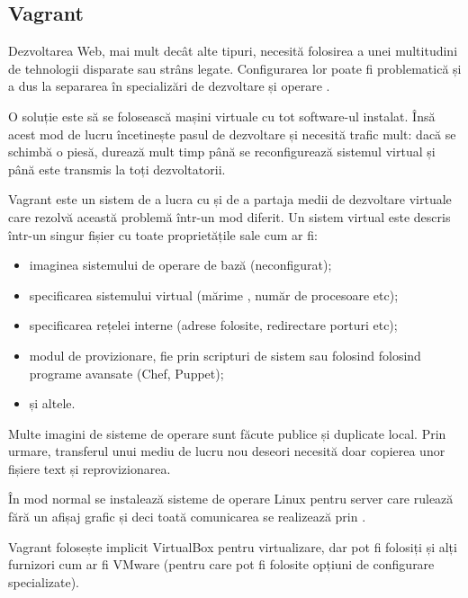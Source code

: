 \documentclass[a4wide,12pt]{report}
\newcommand{\eng}[1]{{#1}} %
\newcommand{\acr}[1]{{\textsmaller[1]{\textsc{#1}}}} %
\begin{document}
\subsection{Vagrant}
\label{vagrantsub}

Dezvoltarea Web, mai mult decât alte tipuri, necesită folosirea a unei
multitudini de tehnologii disparate sau strâns legate. Configurarea lor poate fi
problematică și a dus la separarea în specializări de dezvoltare și operare
\acr{IT}.

O soluție este să se folosească mașini virtuale cu tot \eng{software}-ul
instalat. Însă acest mod de lucru încetinește pasul de dezvoltare și necesită
trafic mult: dacă se schimbă o piesă, durează mult timp până se reconfigurează
sistemul virtual și până este transmis la toți dezvoltatorii.

Vagrant este un sistem de a lucra cu și de a partaja medii de dezvoltare
virtuale care rezolvă această problemă într-un mod diferit. Un sistem virtual
este descris într-un singur fișier cu toate proprietățile sale cum ar fi:

\begin{itemize}

\item imaginea sistemului de operare de bază (neconfigurat);

\item specificarea sistemului virtual (mărime \acr{RAM}, număr de procesoare
etc);

\item specificarea rețelei interne (adrese \acr{IP} folosite, redirectare
porturi etc);

\item modul de provizionare, fie prin scripturi de sistem sau folosind folosind
programe avansate (Chef, Puppet);

\item și altele.

\end{itemize}

Multe imagini de sisteme de operare sunt făcute publice și duplicate local. Prin
urmare, transferul unui mediu de lucru nou deseori necesită doar copierea unor
fișiere text și reprovizionarea.

În mod normal se instalează sisteme de operare Linux pentru server care rulează
fără un afișaj grafic și deci toată comunicarea se realizează prin \acr{SSH}.

Vagrant folosește implicit VirtualBox pentru virtualizare, dar pot fi folosiți
și alți furnizori cum ar fi VMware (pentru care pot fi folosite opțiuni de
configurare specializate).
\end{document}
